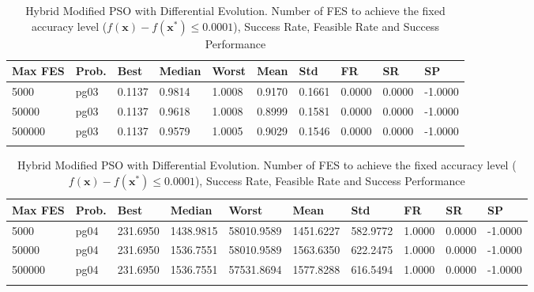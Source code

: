 \documentclass[10pt, a4paper]{book}
\begin{document}
\begin{center}
\begin{longtable}{l l l l l l l l l l}
\textbf{Max FES} & \textbf{Prob.} & \textbf{Best} & \textbf{Median} & \textbf{Worst} & \textbf{Mean} & \textbf{Std} & \textbf{FR} & \textbf{SR} & \textbf{SP} \\
\hline
5000 & pg03 & 0.1137 & 0.9814 & 1.0008 & 0.9170 & 0.1661 & 0.0000 & 0.0000 & -1.0000 \\
50000 & pg03 & 0.1137 & 0.9618 & 1.0008 & 0.8999 & 0.1581 & 0.0000 & 0.0000 & -1.0000 \\
500000 & pg03 & 0.1137 & 0.9579 & 1.0005 & 0.9029 & 0.1546 & 0.0000 & 0.0000 & -1.0000 \\

\caption{ Hybrid Modified PSO with Differential Evolution. Number of FES to achieve the fixed accuracy level ($f(\mathbf{x}) - f(\mathbf{x}^{*}) \leq 0.0001$), Success Rate, Feasible Rate and Success Performance }
\end{longtable}
\end{center}

\begin{center}
\begin{longtable}{l l l l l l l l l l}
\textbf{Max FES} & \textbf{Prob.} & \textbf{Best} & \textbf{Median} & \textbf{Worst} & \textbf{Mean} & \textbf{Std} & \textbf{FR} & \textbf{SR} & \textbf{SP} \\
\hline
5000 & pg04 & 231.6950 & 1438.9815 & 58010.9589 & 1451.6227 & 582.9772 & 1.0000 & 0.0000 & -1.0000 \\
50000 & pg04 & 231.6950 & 1536.7551 & 58010.9589 & 1563.6350 & 622.2475 & 1.0000 & 0.0000 & -1.0000 \\
500000 & pg04 & 231.6950 & 1536.7551 & 57531.8694 & 1577.8288 & 616.5494 & 1.0000 & 0.0000 & -1.0000 \\

\caption{ Hybrid Modified PSO with Differential Evolution. Number of FES to achieve the fixed accuracy level ($f(\mathbf{x}) - f(\mathbf{x}^{*}) \leq 0.0001$), Success Rate, Feasible Rate and Success Performance }
\end{longtable}
\end{center}
\end{document}
